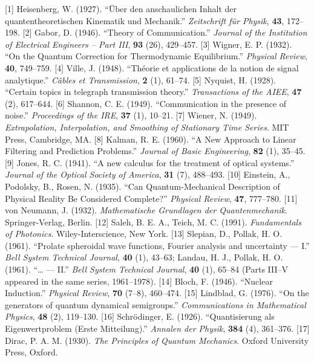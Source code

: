 \documentclass[
]{article}
\begin{document}
{[}1{]} Heisenberg, W. (1927). ``Über den anschaulichen Inhalt der
quantentheoretischen Kinematik und Mechanik.'' \emph{Zeitschrift für
Physik}, \textbf{43}, 172--198. {[}2{]} Gabor, D. (1946). ``Theory of
Communication.'' \emph{Journal of the Institution of Electrical
Engineers -- Part III}, \textbf{93} (26), 429--457. {[}3{]} Wigner, E.
P. (1932). ``On the Quantum Correction for Thermodynamic Equilibrium.''
\emph{Physical Review}, \textbf{40}, 749--759. {[}4{]} Ville, J. (1948).
``Théorie et applications de la notion de signal analytique.''
\emph{Câbles et Transmission}, \textbf{2} (1), 61--74. {[}5{]} Nyquist,
H. (1928). ``Certain topics in telegraph transmission theory.''
\emph{Transactions of the AIEE}, \textbf{47} (2), 617--644. {[}6{]}
Shannon, C. E. (1949). ``Communication in the presence of noise.''
\emph{Proceedings of the IRE}, \textbf{37} (1), 10--21. {[}7{]} Wiener,
N. (1949). \emph{Extrapolation, Interpolation, and Smoothing of
Stationary Time Series}. MIT Press, Cambridge, MA. {[}8{]} Kalman, R. E.
(1960). ``A New Approach to Linear Filtering and Prediction Problems.''
\emph{Journal of Basic Engineering}, \textbf{82} (1), 35--45. {[}9{]}
Jones, R. C. (1941). ``A new calculus for the treatment of optical
systems.'' \emph{Journal of the Optical Society of America}, \textbf{31}
(7), 488--493. {[}10{]} Einstein, A., Podolsky, B., Rosen, N. (1935).
``Can Quantum-Mechanical Description of Physical Reality Be Considered
Complete?'' \emph{Physical Review}, \textbf{47}, 777--780. {[}11{]} von
Neumann, J. (1932). \emph{Mathematische Grundlagen der Quantenmechanik}.
Springer-Verlag, Berlin. {[}12{]} Saleh, B. E. A., Teich, M. C. (1991).
\emph{Fundamentals of Photonics}. Wiley-Interscience, New York. {[}13{]}
Slepian, D., Pollak, H. O. (1961). ``Prolate spheroidal wave functions,
Fourier analysis and uncertainty --- I.'' \emph{Bell System Technical
Journal}, \textbf{40} (1), 43--63; Landau, H. J., Pollak, H. O. (1961).
``\ldots{} --- II.'' \emph{Bell System Technical Journal}, \textbf{40}
(1), 65--84 (Parts III--V appeared in the same series, 1961--1978).
{[}14{]} Bloch, F. (1946). ``Nuclear Induction.'' \emph{Physical
Review}, \textbf{70} (7--8), 460--474. {[}15{]} Lindblad, G. (1976).
``On the generators of quantum dynamical semigroups.''
\emph{Communications in Mathematical Physics}, \textbf{48} (2),
119--130. {[}16{]} Schrödinger, E. (1926). ``Quantisierung als
Eigenwertproblem (Erste Mitteilung).'' \emph{Annalen der Physik},
\textbf{384} (4), 361--376. {[}17{]} Dirac, P. A. M. (1930). \emph{The
Principles of Quantum Mechanics}. Oxford University Press, Oxford.
\end{document}
